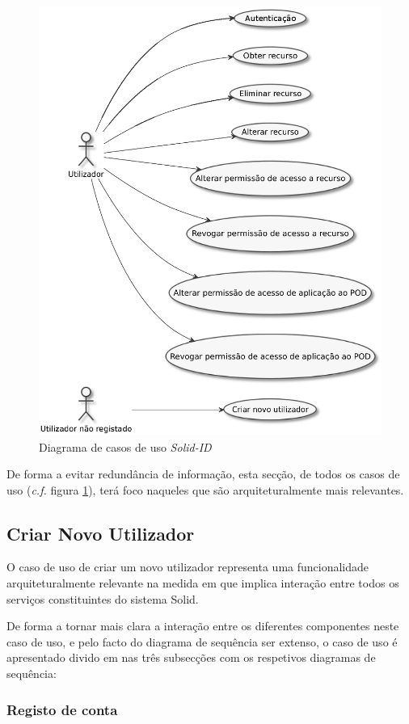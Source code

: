 \begin{figure}[h]
    \begin{center}
    \includegraphics[height=0.9 \textwidth]{figures/uc_diagram.eps}
    \caption{Diagrama de casos de uso
    \emph{Solid-ID}}
    \label{uc_diagram}
    \end{center}
\end{figure}

De forma a evitar redundância de informação, esta secção, de todos os casos de uso (\emph{c.f.} figura \ref{uc_diagram}), terá foco naqueles que são arquiteturalmente mais relevantes.

\subsection{Criar Novo Utilizador \label{create_user_use_case_design}}

O caso de uso de criar um novo utilizador representa uma funcionalidade arquiteturalmente relevante na medida em que implica interação entre todos os serviços constituintes do sistema Solid.

De forma a tornar mais clara a interação entre os diferentes componentes neste caso de uso, e pelo facto do diagrama de sequência ser extenso, o caso de uso é apresentado divido em nas três subsecções com os respetivos diagramas de sequência:

\subsubsection{Registo de conta}

